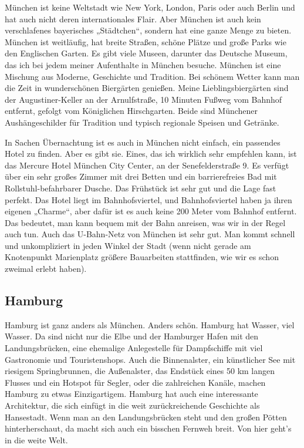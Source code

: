 \documentclass[fontsize=14pt,a4paper,headinclude,DIV=calc,automark]{scrbook}
\begin{document}
München ist keine Weltstadt wie New York, London, Paris oder auch Berlin und hat auch nicht deren internationales Flair. Aber München ist auch kein verschlafenes bayerisches „Städtchen“, sondern hat eine ganze Menge zu bieten. München ist weitläufig, hat breite Straßen, schöne Plätze und große Parks wie den Englischen Garten. Es gibt viele Museen, darunter das Deutsche Museum, das ich bei jedem meiner Aufenthalte in München besuche. München ist eine Mischung aus Moderne, Geschichte und Tradition. Bei schönem Wetter kann man die Zeit in wunderschönen Biergärten genießen. Meine Lieblingsbiergärten sind der Augustiner-Keller an der Arnulfstraße, 10 Minuten Fußweg vom Bahnhof entfernt, gefolgt vom Königlichen Hirschgarten. Beide sind Münchener Aushängeschilder für Tradition und typisch regionale Speisen und Getränke.

In Sachen Übernachtung ist es auch in München nicht einfach, ein passendes Hotel zu finden. Aber es gibt sie. Eines, das ich wirklich sehr empfehlen kann, ist das Mercure Hotel München City Center, an der Senefelderstraße 9. Es verfügt über ein sehr großes Zimmer mit drei Betten und ein barrierefreies Bad mit Rollstuhl-befahrbarer Dusche. Das Frühstück ist sehr gut und die Lage fast perfekt. Das Hotel liegt im Bahnhofsviertel, und Bahnhofsviertel haben ja ihren eigenen „Charme“, aber dafür ist es auch keine 200 Meter vom Bahnhof entfernt. Das bedeutet, man kann bequem mit der Bahn anreisen, was wir in der Regel auch tun. Auch das U-Bahn-Netz von München ist sehr gut. Man kommt schnell und unkompliziert in jeden Winkel der Stadt (wenn nicht gerade am Knotenpunkt Marienplatz größere Bauarbeiten stattfinden, wie wir es schon zweimal erlebt haben).

\subsection{Hamburg}

Hamburg ist ganz anders als München. Anders schön. Hamburg hat Wasser, viel Wasser. Da sind nicht nur die Elbe und der Hamburger Hafen mit den Landungsbrücken, eine ehemalige Anlegestelle für Dampfschiffe mit viel Gastronomie und Touristenshops. Auch die Binnenalster, ein künstlicher See mit riesigem Springbrunnen, die Außenalster, das Endstück eines 50 km langen Flusses und ein Hotspot für Segler, oder die zahlreichen Kanäle, machen Hamburg zu etwas Einzigartigem. Hamburg hat auch eine interessante Architektur, die sich einfügt in die weit zurückreichende Geschichte als Hansestadt. Wenn man an den Landungsbrücken steht und den großen Pötten hinterherschaut, da macht sich auch ein bisschen Fernweh breit. Von hier geht’s in die weite Welt.
\end{document}

